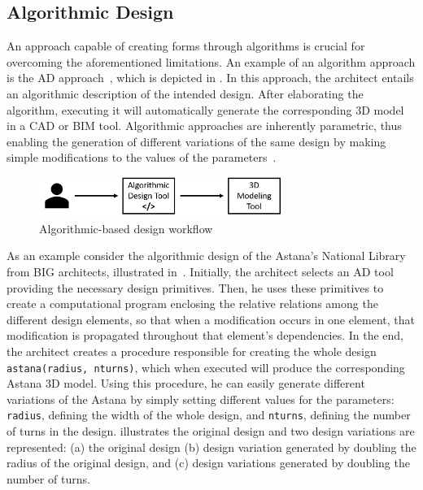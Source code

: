 \subsection{Algorithmic Design}

	An approach capable of creating forms through algorithms is crucial for overcoming the aforementioned limitations. An example of an algorithm approach is the \ac{AD} approach~\cite{Branco2017AD}, which is depicted in . In this approach, the architect entails an algorithmic description of the intended design. After elaborating the algorithm, executing it will automatically generate the corresponding 3D model in a \ac{CAD} or \ac{BIM} tool. Algorithmic approaches are inherently parametric, thus enabling the generation of different variations of the same design by making simple modifications to the values of the parameters~\cite{Leitao2014GD}. 
	
\begin{figure}[htbp]
\centering
\includegraphics[width=0.70\textwidth]{./Images/Introduction/AlgorithmicArchitecturalDesign.png}
\caption[General view of the Algorithmic Design Approach]{Algorithmic-based design workflow}
\label{fig:algorithmicdesign}
\end{figure}
	
	As an example consider the  algorithmic design of the Astana's National Library from BIG architects, illustrated in~. Initially, the architect selects an \ac{AD} tool providing the necessary design primitives. Then, he uses these primitives to create a computational program enclosing the relative relations among the different design elements, so that when a modification occurs in one element, that modification is propagated throughout that element's dependencies. In the end, the architect creates a procedure responsible for creating the whole design \texttt{astana(radius, nturns)}, which when executed will produce the corresponding Astana 3D model. Using this procedure, he can easily generate different variations of the Astana by simply setting different values for the parameters: \texttt{radius}, defining the width of the whole design, and \texttt{nturns}, defining the number of turns in the design.  illustrates the original design and two design variations are represented: (a) the original design (b) design variation generated by doubling the radius of the original design, and (c) design variations generated by doubling the number of turns.
	
